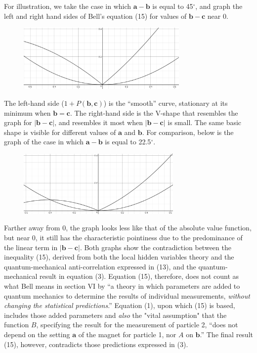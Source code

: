 For illustration, we take the case in which $\pmb{a}-\pmb{b}$ is equal to 45$^\circ$, and graph
the left and right hand sides of Bell's equation (15) for values of $\pmb{b}-\pmb{c}$ near 0.

\begin{figure}[h]
  \begin{center}
    \includegraphics[width=3.26667in,height=1.29333in]{images/17_bell/contradiction.png}
  \end{center}
\end{figure}

The left-hand side ($1 + P(\pmb{b},\pmb{c})$) is the ``smooth'' curve, stationary at its minimum 
when $\pmb{b}=\pmb{c}$. The right-hand side is the V-shape that resembles the graph for 
$|\pmb{b}-\pmb{c}|$, and resembles it most when $|\pmb{b}-\pmb{c}|$ is small. The same basic shape 
is visible for different values of $\pmb{a}$ and $\pmb{b}$. For comparison, below is the graph of 
the case in which $\pmb{a}-\pmb{b}$ is equal to 22.5$^\circ$.

\begin{figure}[h]
  \begin{center}
    \includegraphics[width=3.14667in,height=1.27in]{images/17_bell/contradiction2.png}
  \end{center}
\end{figure}

Farther away from 0, the graph looks less like that of the absolute value function, but near 0,
it still has the characteristic pointiness due to the predominance of the linear term in $|\pmb{b}-\pmb{c}|$. 
Both graphs show the contradiction between the inequality (15), derived from both the local hidden
variables theory and the quantum-mechanical anti-correlation expressed in (13), and the quantum-mechanical
result in equation (3). Equation (15), therefore, does not count as what Bell means in section VI by ``a theory in which parameters are added to quantum mechanics to determine the results of individual measurements,
\emph{without changing the statistical predictions}.'' Equation (1), upon which (15) is based,
includes those added parameters and \emph{also} the "vital assumption" that the 
function $B$, specifying the result for the measurement of particle 2, ``does not depend on the setting $\pmb{a}$ of the magnet for particle 1, nor $A$ on $\pmb{b}$.'' The final result (15), however, contradicts those predictions expressed in (3).

